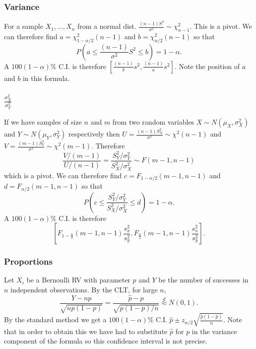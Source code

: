 \documentclass[10pt, two column]{article}
\begin{document}
\subsubsection{Variance}

For a sample $X_{1}, \dots, X_{n}$ from a normal dist. $\frac{(n-1)S^{2}}{\sigma^{2}} \sim \chi_{n-1}^{2}$. This is a pivot. We can therefore find $a = \chi_{1-\alpha/2}^{2}(n-1)$ and $b = \chi_{\alpha/2}^{2}(n-1)$ so that 
\[ P\left( a \leq \frac{(n-1)}{\sigma^{2}}S^{2} \leq b \right) = 1-\alpha. \]
A $100(1-\alpha)\%$ C.I. is therefore $[ \frac{(n-1)}{b}s^{2}, \frac{(n-1)}{a}s^{2} ]$. Note the position of $a$ and $b$ in this formula. 

\subsubsection{$\frac{\sigma_{X}^{2}}{\sigma_{Y}^{2}}$} \label{Comp. of var.}

If we have samples of size $n$ and $m$ from two random variables $X \sim N(\mu_{X}, \sigma_{X}^{2})$ and $Y \sim N(\mu_{Y}, \sigma_{Y}^{2})$ respectively then $U = \frac{(n-1)S_{X}^{2}}{\sigma^{2}} \sim \chi^{2}(n-1)$ and $V = \frac{(m-1)S_{Y}^{2}}{\sigma^{2}} \sim \chi^{2}(m-1)$. Therefore
\[ \frac{V/(m-1)}{U/(n-1)} = \frac{S_{Y}^{2}/\sigma_{Y}^{2}}{S_{X}^{2}/\sigma_{X}^{2}} \sim F(m-1, n-1) \]
which is a pivot. We can therefore find $c = F_{1-\alpha/2}(m-1, n-1)$ and $d = F_{\alpha/2}(m-1,n-1)$ so that 
\[ P\left( c \leq \frac{S_{Y}^{2}/\sigma_{Y}^{2}}{S_{X}^{2}/\sigma_{X}^{2}} \leq d \right) = 1-\alpha. \]
A $100(1-\alpha)\%$ C.I. is therefore 
\[ \left[ F_{1-\frac{\alpha}{2}}(m-1, n-1) \frac{s_{x}^{2}}{s_{y}^{2}}, F_{\frac{\alpha}{2}}(m-1, n-1) \frac{s_{x}^{2}}{s_{y}^{2}} \right]. \]

\subsubsection{Proportions}

Let $X_{i}$ be a Bernoulli RV with parameter $p$ and $Y$ be the number of successes in $n$ independent observations. By the CLT, for large $n$, 
\[\frac{Y-np}{\sqrt{np(1-p)}} = \frac{\widehat{p} - p}{\sqrt{p(1-p)/n}} \stackrel{d}{\approx} N(0,1).\]
By the standard method we get a $100(1-\alpha)\%$ C.I. $\widehat{p} \pm z_{\alpha/2} \sqrt{\frac{\widehat{p}(1-\widehat{p})}{n}}$. Note that in order to obtain this we have had to substitute $\widehat{p}$ for $p$ in the variance component of the formula so this confidence interval is not precise. 
\end{document}

